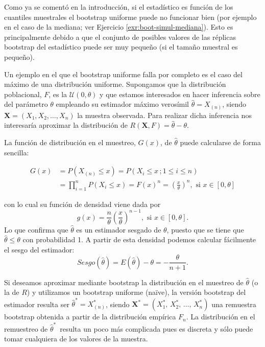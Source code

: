\documentclass[
]{book}
\theoremstyle{break}
\theoremstyle{nonumberplain}
\begin{document}
Como ya se comentó en la introducción, si el estadístico es función de los cuantiles muestrales el bootstrap uniforme puede no funcionar bien (por ejemplo en el caso de la mediana; ver Ejercicio \ref{exr:boot-simul-mediana}).
Esto es principalmente debido a que el conjunto de posibles valores de las réplicas bootstrap del estadístico puede ser muy pequeño (si el tamaño muestral es pequeño).

Un ejemplo en el que el bootstrap uniforme falla por completo es el caso del máximo de una distribución uniforme.
Supongamos que la distribución poblacional, \(F\), es la \(\mathcal{U}\left( 0,\theta \right)\) y que estamos interesados en hacer inferencia sobre del parámetro \(\theta\) empleando su estimador máximo verosímil \(\hat{\theta}=X_{(n)}\), siendo \(\mathbf{X}=\left( X_1,X_2,\ldots ,X_n \right)\) la muestra observada.
Para realizar dicha inferencia nos interesaría aproximar la distribución de
\(R\left( \mathbf{X},F \right) =\hat{\theta}-\theta\).

La función de distribución en el muestreo, \(G\left( x \right)\), de
\(\hat{\theta}\) puede calcularse de forma sencilla:

\[\begin{aligned}
G\left( x \right) &= P\left( X_{\left(
n \right)}\leq x \right) =P\left( X_i\leq x\,;
 1 \leq i \leq n \right) \\
&= \prod_{i=1}^{n}P\left( X_i\leq x \right) =F\left( x \right)^{n}=\left( 
\frac{x}{\theta } \right)^{n},\text{ si }x\in \left[ 0,\theta \right]\end{aligned}\]

con lo cual su función de densidad viene dada por
\[g\left( x \right) =\frac{n}{\theta }\left( \frac{x}{\theta } \right)^{n-1},
\text{ si }x\in \left[ 0,\theta \right] .\]
Lo que confirma que \(\hat{\theta}\) es un estimador sesgado de \(\theta\), puesto que se tiene que \(\hat{\theta}\leq \theta\) con probabilidad 1.
A partir de esta densidad podemos calcular fácilmente el sesgo del estimador:
\[Sesgo\left( \hat{\theta} \right) =E\left( \hat{\theta} \right) -\theta = -\frac{\theta }{n+1}.\]

Si deseamos aproximar mediante bootstrap la distribución en el muestreo de \(\hat{\theta}\) (o la de \(R\)) y utilizamos un bootstrap uniforme (naïve), la versión bootstrap del estimador resulta ser \(\hat{\theta}^{\ast}=X_{(n)}^{\ast}\),
siendo \(\mathbf{X}^{\ast}=\left(X_1^{\ast}\text{, }X_2^{\ast}\text{, }\ldots \text{, }X_n^{\ast} \right)\) una remuestra bootstrap obtenida a partir de la distribución empírica \(F_n\).
La distribución en el remuestreo de \(\hat{\theta} ^{\ast}\,\) resulta un poco más complicada pues es discreta y sólo puede
tomar cualquiera de los valores de la muestra.
\end{document}
